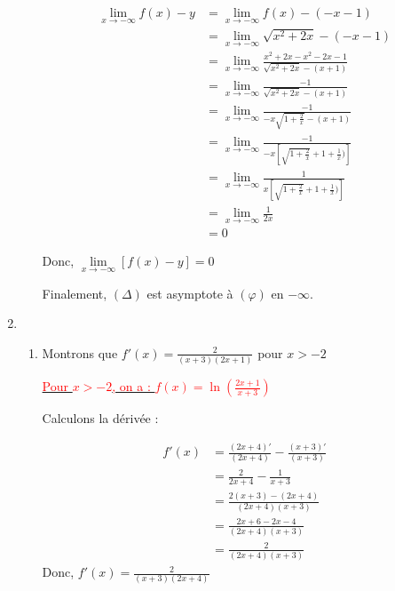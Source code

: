 \documentclass[12pt,a4paper]{article}
\begin{document}
\begin{enumerate}
\begin{enumerate}
\begin{align*}
    \lim_{x \to -\infty} f(x) - y &= \lim_{x \to -\infty} f(x) - (-x - 1)\\
                                  &= \lim_{x \to -\infty} \sqrt{x^{2}+2x} - (-x-1)\\
                                  &= \lim_{x \to -\infty} \frac{x^2 + 2x - x^2 - 2x - 1}{\sqrt{x^2 + 2x} - (x + 1)}\\
                                  &= \lim_{x \to -\infty} \frac{-1}{\sqrt{x^2 + 2x} - (x + 1)}\\
                                  &= \lim_{x \to -\infty} \frac{-1}{-x \sqrt{1 + \frac{2}{x}} - (x + 1)}\\
                                  &= \lim_{x \to -\infty} \frac{-1}{-x \left[\sqrt{1 + \frac{2}{x}} + 1 + \frac{1}{x})\right]}\\
                                  &= \lim_{x \to -\infty} \frac{1}{x \left[\sqrt{1 + \frac{2}{x}} + 1 + \frac{1}{x})\right]}\\
                                  &= \lim_{x \to -\infty} \frac{1}{2x}\\
                                  &=0
\end{align*}

Donc, \( \lim\limits_{x \to -\infty} \left[ f(x) - y \right] = 0 \)

Finalement, \( (\Delta) \) est asymptote à \( (\varphi) \) en \( -\infty \).

\end{enumerate}
\item
\begin{enumerate}
    \item  Montrons que \( f'(x) = \frac{2}{(x+3)(2x+1)} \) pour \( x > -2 \)

\underline{\textcolor{red}{Pour \( x > -2 \), on a : \( f(x) = \ln \left( \frac{2x+1}{x+3} \right) \)}}

Calculons la dérivée :

\begin{align*}
    f'(x) &= \frac{(2x+4)'}{(2x+4)} - \frac{(x+3)'}{(x+3)} \\
          &= \frac{2}{2x+4} - \frac{1}{x+3} \\
          &= \frac{2(x+3) - (2x+4)}{(2x+4)(x+3)} \\
          &= \frac{2x+6 - 2x - 4}{(2x+4)(x+3)} \\
          &= \frac{2}{(2x+4)(x+3)}
\end{align*}
Donc, \( f'(x) = \frac{2}{(x+3)(2x+4)} \)


\end{enumerate}
\end{enumerate}
\end{document}
